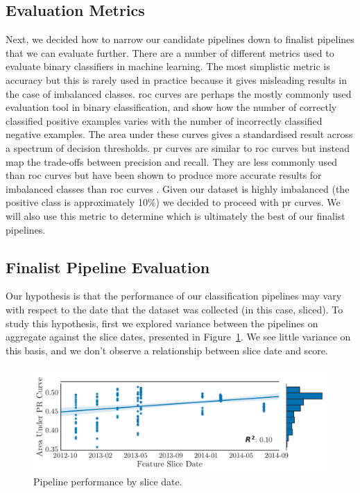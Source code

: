 \documentclass[../thesis/thesis.tex]{subfiles}
\begin{document}
\subsection{Evaluation Metrics}

Next, we decided how to narrow our candidate pipelines down to finalist pipelines that we can evaluate further. There are a number of different metrics used to evaluate binary classifiers in machine learning. The most simplistic metric is accuracy but this is rarely used in practice because it gives misleading results in the case of imbalanced classes. \Gls{roc} curves are perhaps the mostly commonly used evaluation tool in binary classification, and show how the number of correctly classified positive examples varies with the number of incorrectly classified negative examples. The area under these curves gives a standardised result across a spectrum of decision thresholds. \Gls{pr} curves are similar to \gls{roc} curves but instead map the trade-offs between precision and recall. They are less commonly used than \gls{roc} curves but have been shown to produce more accurate results for imbalanced classes than \gls{roc} curves \cite{davis2006}. Given our dataset is highly imbalanced (the positive class is approximately 10\%) we decided to proceed with \gls{pr} curves. We will also use this metric to determine which is ultimately the best of our finalist pipelines.

\subsection{Finalist Pipeline Evaluation}

Our hypothesis is that the performance of our classification pipelines may vary with respect to the date that the dataset was collected (in this case, sliced). To study this hypothesis, first we explored variance between the pipelines on aggregate against the slice dates, presented in Figure~\ref{fig:design:selection_agg_slice}. We see little variance on this basis, and we don't observe a relationship between slice date and score.

\begin{figure}[!htb]
    \centering
    \includegraphics[width=\textwidth]{../figures/design/auc_finalists_agg}
    \caption[Pipeline performance by slice date]{Pipeline performance by slice date.}
    \label{fig:design:selection_agg_slice}
\end{figure}
\end{document}
